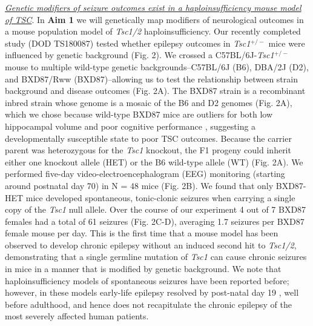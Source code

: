 \documentclass[
  12pt,
]{article}
\begin{document}
\textit{\underline{Genetic modifiers of seizure outcomes exist in a haploinsufficiency mouse model of TSC}}.
In \textbf{Aim 1} we will genetically map modifiers of neurological
outcomes in a mouse population model of \textit{Tsc1/2}
haploinsufficiency. Our recently completed study (DOD TS180087) tested
whether epilepsy outcomes in \textit{Tsc1}\(^{+/-}\) mice were
influenced by genetic background (Fig. 2). We crossed a
C57BL/6J-\textit{Tsc1}\(^{+/-}\) mouse to multiple wild-type genetic
backgrounds--C57BL/6J (B6), DBA/2J (D2), and BXD87/Rww (BXD87)--allowing
us to test the relationship between strain background and disease
outcomes (Fig. 2A). The BXD87 strain is a recombinant inbred strain
whose genome is a mosaic of the B6 and D2 genomes (Fig. 2A), which we
chose because wild-type BXD87 mice are outliers for both low hippocampal
volume and poor cognitive performance
\cite{26449520, 28544613, 29457871}, suggesting a developmentally
susceptible state to poor TSC outcomes. Because the carrier parent was
heterozygous for the \textit{Tsc1} knockout, the F1 progeny could
inherit either one knockout allele (HET) or the B6 wild-type allele (WT)
(Fig. 2A). We performed five-day video-electroencephalogram (EEG)
monitoring (starting around postnatal day 70) in N = 48 mice (Fig. 2B).
We found that only BXD87-HET mice developed spontaneous, tonic-clonic
seizures when carrying a single copy of the \textit{Tsc1} null allele.
Over the course of our experiment 4 out of 7 BXD87 females had a total
of 61 seizures (Fig. 2C-D), averaging 1.7 seizures per BXD87 female
mouse per day. This is the first time that a mouse model has been
observed to develop chronic epilepsy without an induced second hit to
\textit{Tsc1/2}, demonstrating that a single germline mutation of
\textit{Tsc1} can cause chronic seizures in mice in a manner that is
modified by genetic background. We note that haploinsufficiency models
of spontaneous seizures have been reported before; however, in these
models early-life epilepsy resolved by post-natal day 19
\cite{25081057}, well before adulthood, and hence does not recapitulate
the chronic epilepsy of the most severely affected human patients.
\end{document}
